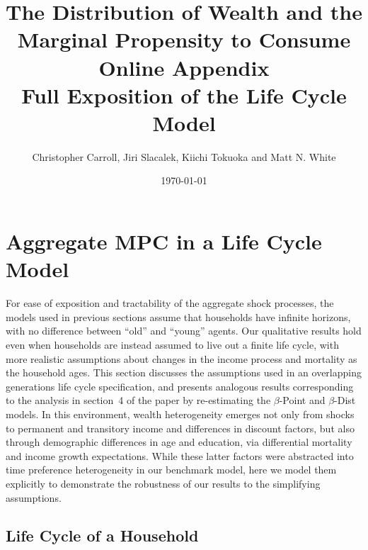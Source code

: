 \documentclass{econtex}\usepackage[pdftex]{graphicx}\usepackage{epstopdf} \usepackage[pdftex]{hyperref}
\newcommand{\Discount}{\ensuremath{\beta}}
\begin{document}
%


\title{\textbf{
{\normalsize The Distribution of Wealth and the Marginal Propensity to Consume}\\[5mm]
Online Appendix\\
Full Exposition of the Life Cycle Model
}%
}%

\author[]{Christopher Carroll, Jiri Slacalek, Kiichi Tokuoka and Matt N. White}

\date{\today}

\maketitle
\vspace*{-6mm}

\thispagestyle{empty}
\newpage


\section{Aggregate MPC in a Life Cycle Model}\label{sec:Robustness}

For ease of exposition and tractability of the aggregate shock processes, the models used in previous sections assume that households have infinite horizons, with no difference between ``old'' and ``young'' agents.  Our qualitative results hold even when households are instead assumed to live out a finite life cycle, with more realistic assumptions about changes in the income process and mortality as the household ages.  This section discusses the assumptions used in an overlapping generations life cycle specification, and presents analogous results corresponding to the analysis in section~4 of the paper by re-estimating the \Discount-Point and \Discount-Dist models.  In this environment, wealth heterogeneity emerges not only from shocks to permanent and transitory income and differences in discount factors, but also through demographic differences in age and education, via differential mortality and income growth expectations.  While these latter factors were abstracted into time preference heterogeneity in our benchmark model, here we model them explicitly to demonstrate the robustness of our results to the simplifying assumptions.

\subsection{Life Cycle of a Household}\label{sec:LifeCycle}
\end{document}
